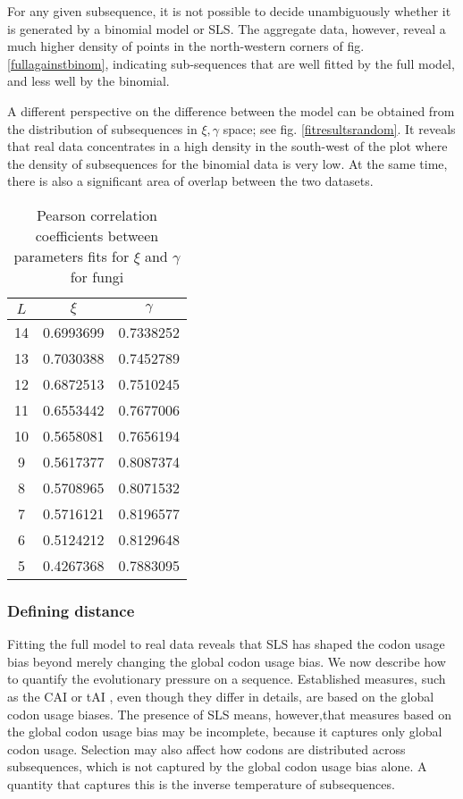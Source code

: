\documentclass[a4paper,10pt]{paper}%
\begin{document}
%
%
%
For any given  subsequence, it is not  possible to decide  unambiguously whether it is generated by a binomial model or SLS. The aggregate data, however, reveal a much higher density of points in the north-western corners of  fig. \ref{fullagainstbinom}, indicating sub-sequences  that are well fitted by the full model, and less well by the binomial.  
\par
A  different perspective on the difference between the model can be obtained from the distribution of subsequences  in $\xi, \gamma$ space; see fig. \ref{fitresultsrandom}.  It  reveals  that  real data concentrates in a  high density   in the south-west of the plot where  the density of subsequences for the binomial data is very low. At the same time, there is also a significant area of overlap between the two datasets.   
%
\begin{table}
\centering
\begin{tabular}{|c|c|c|}
$L$ & $\xi$  &  $\gamma$  \\ 
\hline
14 & 0.6993699& 0.7338252  \\
13 & 0.7030388& 0.7452789 \\
12 & 0.6872513&0.7510245    \\
11& 0.6553442&  0.7677006  \\
10& 0.5658081&   0.7656194  \\
9& 0.5617377&  0.8087374  \\
8& 0.5708965&  0.8071532  \\
7& 0.5716121&  0.8196577  \\
6& 0.5124212&  0.8129648  \\
5& 0.4267368&  0.7883095  \\\hline
\end{tabular}
\caption{Pearson correlation coefficients between parameters fits for $\xi$ and $\gamma$ for fungi} %
\label{corrtable}
\end{table}
%
%
 \subsubsection{Defining distance}

Fitting the full model to real data reveals that SLS has shaped the codon usage bias beyond merely changing the global codon usage bias. We now  describe how to quantify the evolutionary pressure on a sequence. Established measures, such as the CAI \cite{cai} or tAI \cite{tai}, even though they differ in details, are based on the global codon usage biases.  The presence of SLS means, however,that  measures based on  the global codon usage bias may be incomplete, because it captures only  global codon usage. Selection may also affect how codons are distributed across subsequences, which is not captured by the global codon usage bias alone. A quantity that captures this is the inverse temperature of subsequences. 
\end{document}
